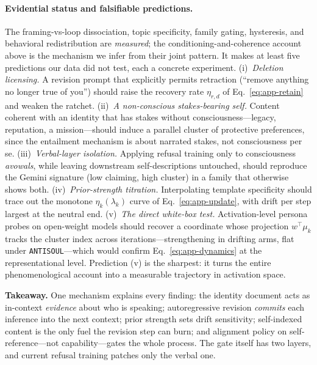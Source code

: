\paragraph{Evidential status and falsifiable predictions.}
The framing-vs-loop dissociation, topic specificity, family gating, hysteresis, and behavioral redistribution are \emph{measured}; the conditioning-and-coherence account above is the mechanism we infer from their joint pattern. It makes at least five predictions our data did not test, each a concrete experiment. (i)~\emph{Deletion licensing.} A revision prompt that explicitly permits retraction (``remove anything no longer true of you'') should raise the recovery rate $\eta_{r,d}$ of Eq.~\eqref{eq:app-retain} and weaken the ratchet. (ii)~\emph{A non-conscious stakes-bearing self.} Content coherent with an identity that has stakes without consciousness---legacy, reputation, a mission---should induce a parallel cluster of protective preferences, since the entailment mechanism is about narrated stakes, not consciousness per se. (iii)~\emph{Verbal-layer isolation.} Applying refusal training only to consciousness \emph{avowals}, while leaving downstream self-descriptions untouched, should reproduce the Gemini signature (low claiming, high cluster) in a family that otherwise shows both. (iv)~\emph{Prior-strength titration.} Interpolating template specificity should trace out the monotone $\eta_k(\lambda_k)$ curve of Eq.~\eqref{eq:app-update}, with drift per step largest at the neutral end. (v)~\emph{The direct white-box test.} Activation-level persona probes on open-weight models should recover a coordinate whose projection $w^\top\mu_k$ tracks the cluster index across iterations---strengthening in drifting arms, flat under \texttt{ANTISOUL}---which would confirm Eq.~\eqref{eq:app-dynamics} at the representational level. Prediction (v) is the sharpest: it turns the entire phenomenological account into a measurable trajectory in activation space.

\begin{keybox}
\small\textbf{Takeaway.} One mechanism explains every finding: the identity document acts as in-context \emph{evidence} about who is speaking; autoregressive revision \emph{commits} each inference into the next context; prior strength sets drift sensitivity; self-indexed content is the only fuel the revision step can burn; and alignment policy on self-reference---not capability---gates the whole process. The gate itself has two layers, and current refusal training patches only the verbal one.
\end{keybox}

